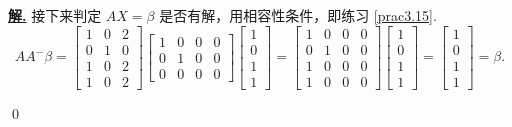 \documentclass[10pt,openany]{article}
\theoremstyle{thmstyle} %
\theoremstyle{defstyle} %
\theoremstyle{prostyle} %
\theoremstyle{exastyle}
\theoremstyle{remstyle}
\newenvironment{solution}{\par\underline{\textbf{解.}} \;\fangsong}{\qed\par}
\begin{document}
\begin{solution}
	接下来判定 \( AX=\beta \) 是否有解，用相容性条件，即练习 \ref{prac3.15}.
	\[ AA^{-}\beta=\begin{bmatrix}
		1 & 0 & 2 \\
		0 & 1 & 0 \\
		1 & 0 & 2 \\
		1 & 0 & 2
	\end{bmatrix}\begin{bmatrix}
	1 & 0 & 0 & 0 \\
	0 & 1 & 0 & 0 \\
	0 & 0 & 0 & 0
	\end{bmatrix}\begin{bmatrix}
	1 \\ 0 \\ 1 \\ 1
	\end{bmatrix}=\begin{bmatrix}
	1 & 0 & 0 & 0\\
	0 & 1 & 0 & 0 \\
	1 & 0 & 0 & 0 \\
	1 & 0 & 0 & 0
	\end{bmatrix}\begin{bmatrix}
	1 \\ 0 \\ 1 \\ 1
	\end{bmatrix}=\begin{bmatrix}
	1 \\ 0 \\ 1 \\ 1
	\end{bmatrix}=\beta. \]
	

\end{solution}
\end{document}
